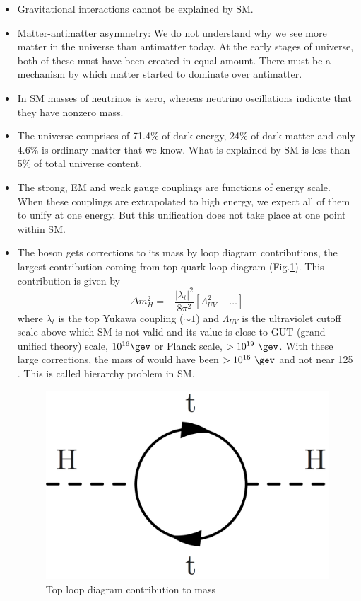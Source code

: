 \begin{itemize}
\item Gravitational interactions cannot be explained by SM.
\item Matter-antimatter asymmetry: We do not understand why we see more matter in the universe than antimatter today. At the early stages of universe, both of these must have been created in equal amount. There must be a mechanism by which matter started to dominate over antimatter.
\item In SM masses of neutrinos is zero, whereas neutrino oscillations indicate that they have nonzero mass.
\item The universe comprises of 71.4\% of dark energy, 24\% of dark matter and only 4.6\% is ordinary matter that we know. What is explained by SM is less than 5\% of total universe content.
\item The strong, EM and weak gauge couplings are functions of energy scale. When these couplings are extrapolated to high energy, we expect all of them to unify at one energy. But this unification does not take place at one point within SM.
\item The \higgs boson gets corrections to its mass by loop diagram contributions, the largest contribution coming from top quark loop diagram (Fig.\ref{fig:hierarchy_problem_higgs}). This contribution is given by
\begin{equation}
\Delta m_{H}^2 = -\frac{|\lambda_t|^2}{8\pi^2}[\Lambda_{UV}^2 + \dots]
\label{eqn:HmassCorr}
\end{equation}
where $\lambda_t$ is the top Yukawa coupling ($\sim 1$) and $\Lambda_{UV}$ is the ultraviolet cutoff scale above which SM is not valid and its value is close to GUT (grand unified theory) scale, $10^{16}\gev$ or Planck scale, $> 10^{19}\ \gev$. With these large corrections, the mass of \higgs would have been $> 10^{16}\ \gev$ and not near 125 \gev. This is called hierarchy problem in SM.
\begin{figure}[h!]
\centering
\includegraphics[width=0.35\linewidth]{../Figures/Chap1/hierarchy_problem_higgs.png}
\caption{Top loop diagram contribution to \higgs mass}
\label{fig:hierarchy_problem_higgs}
\end{figure}
\end{itemize}

